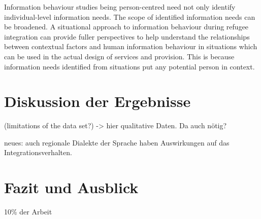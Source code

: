 \documentclass[12pt,oneside]{article}
\begin{document}
Information behaviour studies being person-centred need
not only identify individual-level information needs. The
scope of identified information needs can be broadened. A
situational approach to information behaviour during
refugee integration can provide fuller perspectives to help
understand the relationships between contextual factors and
human information behaviour in situations which can be
used in the actual design of services and provision. This is
because information needs identified from situations put
any potential person in context.







\section{Diskussion der Ergebnisse}
(limitations of the data set?) -> hier qualitative Daten. Da auch nötig?

neues: auch regionale Dialekte der Sprache haben Auswirkungen auf das Integrationsverhalten.

\section{Fazit und Ausblick}

10\% der Arbeit

\clearpage
\lhead{}
\printbibliography
{}



\newpage
\end{document}
